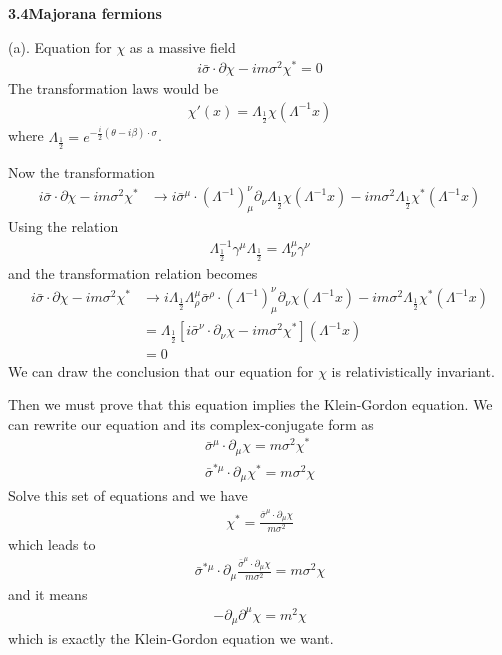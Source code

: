 \documentclass{article}
\newcommand{\trh}{\Lambda_{\frac{1}{2}}}
\begin{document}
{\bf3.4\quad Majorana fermions}

(a). Equation for $\chi$ as a massive field
\begin{align}
  i\bar{\sigma}\cdot\partial{\chi}-im\sigma^2\chi^*=0
\end{align}
The transformation laws would be
\begin{align*}
  \chi'(x)=\trh\chi(\Lambda^{-1}x)
\end{align*}
where $\trh=e^{-\frac{i}{2}(\theta-i\beta)\cdot\sigma}$.

Now the transformation
\begin{align*}
  i\bar{\sigma}\cdot\partial{\chi}-im\sigma^2\chi^*&\rightarrow i\bar{\sigma}^{\mu}\cdot(\Lambda^{-1})^{\nu}_{\mu}\partial_{\nu}\trh{\chi}(\Lambda^{-1}x)-im\sigma^2\trh\chi^*(\Lambda^{-1}x)
\end{align*}
Using the relation
\begin{align*}
  \trh^{-1}\gamma^{\mu}\trh=\Lambda^{\mu}_{\nu}\gamma^{\nu}
\end{align*}
and the transformation relation becomes
\begin{align*}
  i\bar{\sigma}\cdot\partial{\chi}-im\sigma^2\chi^*&\rightarrow i\trh\Lambda^{\mu}_{\rho}\bar{\sigma}^{\rho}\cdot(\Lambda^{-1})^{\nu}_{\mu}\partial_{\nu}{\chi}(\Lambda^{-1}x)-im\sigma^2\trh\chi^*(\Lambda^{-1}x)\\
  &=\trh[i\bar{\sigma}^{\nu}\cdot\partial_{\nu}{\chi}-im\sigma^2\chi^*](\Lambda^{-1}x)\\
  &=0
\end{align*}
We can draw the conclusion that our equation for $\chi$ is relativistically invariant.

Then we must prove that this equation implies the Klein-Gordon equation.
We can rewrite our equation and its complex-conjugate form as
\begin{align*}
  \bar{\sigma}^{\mu}\cdot\partial_{\mu}{\chi}=m\sigma^2\chi^*\\
  \bar{\sigma}^{*\mu}\cdot\partial_{\mu}{\chi^*}=m\sigma^2\chi
\end{align*}
Solve this set of equations and we have
\begin{align*}
  \chi^*=\frac{\bar{\sigma}^{\mu}\cdot\partial_{\mu}{\chi}}{m\sigma^2}
\end{align*}
which leads to
\begin{align*}
  \bar{\sigma}^{*\mu}\cdot\partial_{\mu}\frac{\bar{\sigma}^{\mu}\cdot\partial_{\mu}{\chi}}{m\sigma^2}=m\sigma^2\chi
\end{align*}
and it means
\begin{align*}
  -\partial_{\mu}\partial^{\mu}\chi=m^2\chi
\end{align*}
which is exactly the Klein-Gordon equation we want.
\end{document}

